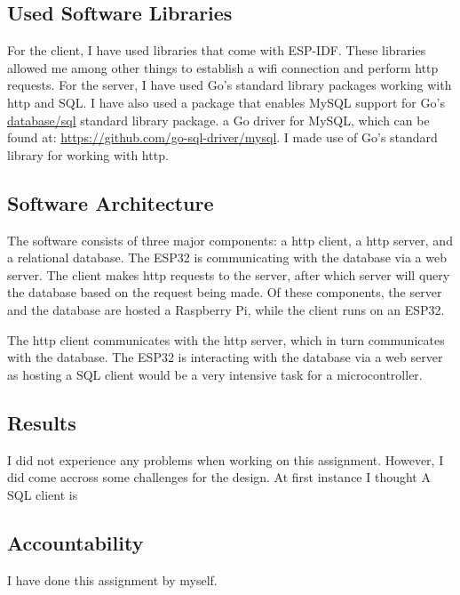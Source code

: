 \subsection{Used Software Libraries}

For the client, I have used libraries that come with ESP-IDF.
These libraries allowed me among other things to establish a \gls{wifi} connection and perform \gls{http} requests.
For the server, I have used Go's standard library packages working with \gls{http} and SQL.
I have also used a package that enables MySQL support for Go's \href{https://pkg.go.dev/database/sql}{database/sql} standard library package.
a Go driver for MySQL, which can be found at: \url{https://github.com/go-sql-driver/mysql}.
I made use of Go's standard library for working with \gls{http}.

\subsection{Software Architecture}

The software consists of three major components: a \gls{http} client, a \gls{http} server, and a relational database.
The ESP32 is communicating with the database via a web server.
The client makes \gls{http} requests to the server, after which server will query the database based on the request being made. Of these components, the  server and the database are hosted a Raspberry Pi, while the  client runs on an ESP32.

The \gls{http} client communicates with the \gls{http} server, which in turn communicates with the database.
The ESP32 is interacting with the database via a web server as hosting a SQL client would be a very intensive task for a microcontroller.

\subsection{Results}

I did not experience any problems when working on this assignment.
However, I did come accross some challenges for the design.
At first instance I thought 
A SQL client is 

\subsection{Accountability}

I have done this assignment by myself.

\clearpage

